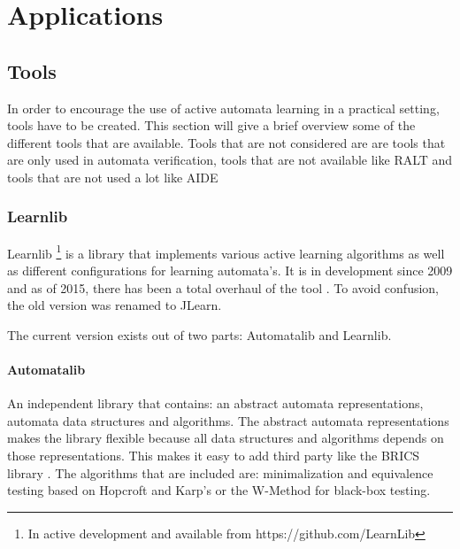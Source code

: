 \documentclass[multi,crop=false,class=article]{standalone}
\begin{document}
\section{Applications}
\label{sec:applications}

\subsection{Tools}
\label{ssec:tools}

In order to encourage the use of active automata learning in a practical 
setting, tools have to be created. This section will give a brief overview some 
of the different tools that are available. Tools that are not considered are
are tools that are only used in automata verification, tools that are not 
available like RALT \cite{Shahbaz:2014:ATB:2858086.2858089} and tools that are 
not used a lot like AIDE \cite{Cicala2016} 

\subsubsection{Learnlib}
\label{sssec:learnlib}

Learnlib  \footnote{In active development and available from 
https://github.com/LearnLib } is a library that implements various active 
learning algorithms as well as different configurations for learning 
automata's. It is in development since 2009 \cite{Raffelt2009} and as of 2015, 
there has been a 
total overhaul of the tool \cite{Isberner2015}. To avoid confusion, the old 
version was renamed 
to JLearn. 

The current version exists out of two parts: Automatalib and Learnlib.


\paragraph{Automatalib} An independent library that contains: an abstract 
automata representations, automata data structures and algorithms. The abstract 
automata representations makes the library flexible because all data structures
and algorithms depends on those representations. This makes it easy to add 
third party like the BRICS library \cite{Alur:2005:SIS:1047659.1040314}. The 
algorithms that are included are: minimalization and equivalence testing based 
on Hopcroft and Karp's \cite{hopcroft1971linear} or the W-Method for black-box 
testing. 
\end{document}
